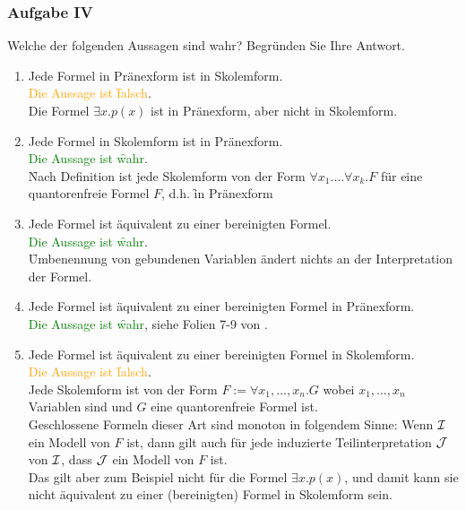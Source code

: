 \subsubsection*{Aufgabe IV}
Welche der folgenden Aussagen sind wahr? Begründen Sie Ihre Antwort.
\begin{enumerate}
\item Jede Formel in Pränexform ist in Skolemform.\\
\LOES \textcolor{orange}{Die Aussage ist \f{falsch}}. \\
Die Formel $\exists x.p(x)$ ist in Pränexform, aber nicht in Skolemform.
\item Jede Formel in Skolemform ist in Pränexform. \\
\LOES \textcolor{green}{Die Aussage ist \f{wahr}}.\\
\f{Nach Definition ist jede Skolemform} von der Form $\forall x_1. \dots \forall x_k. F$ für eine quantorenfreie Formel $F$, d.h. \f{in Pränexform}
\item Jede Formel ist äquivalent zu einer bereinigten Formel. \\
\LOES \textcolor{green}{Die Aussage ist \f{wahr}}. \\
\f{Umbenennung von gebundenen Variablen ändert nichts} an der Interpretation der Formel.
\item Jede Formel ist äquivalent zu einer bereinigten Formel in Pränexform. \\
\LOES \textcolor{green}{Die Aussage ist \f{wahr}}, siehe Folien 7-9 von .
\item Jede Formel ist äquivalent zu einer bereinigten Formel in Skolemform. \\
\LOES \textcolor{orange}{Die Aussage ist \f{falsch}}. \\
Jede Skolemform ist von der Form $F := \forall x_1, \dots, x_n.G$ wobei $x_1, \dots, x_n$ Variablen sind und $G$ eine quantorenfreie Formel ist. \\
Geschlossene Formeln dieser Art sind monoton in folgendem Sinne: Wenn $\mathcal{I}$ ein Modell von $F$ ist, dann gilt auch für jede induzierte Teilinterpretation $\mathcal{J}$ von $\mathcal{I}$, dass $\mathcal{J}$ ein Modell von $F$ ist. \\
Das gilt aber zum Beispiel nicht für die Formel $\exists x.p(x)$, und damit kann sie nicht äquivalent zu einer (bereinigten) Formel in Skolemform sein.
\end{enumerate}

